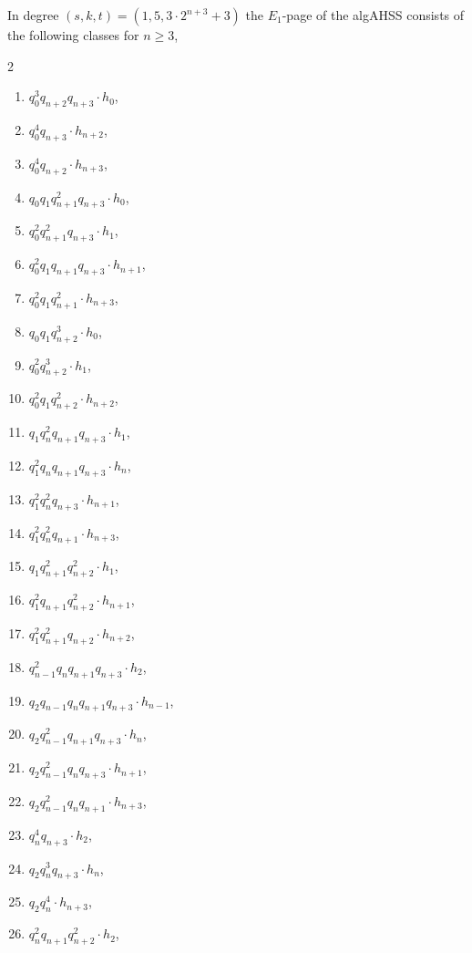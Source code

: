 \begin{lem} \label{candidates CESS}
  In degree $(s,k,t) = (1,5,3 \cdot 2^{n+3}+3)$ the $E_1$-page of the algAHSS consists of the following classes for $n \geq 3$,  
\begin{multicols}{2}
\begin{enumerate}
\item $q_0^3q_{n+2}q_{n+3} \cdot h_0$,
\item $q_0^4q_{n+3} \cdot h_{n+2}$,
\item $q_0^4q_{n+2} \cdot h_{n+3}$,
\item $q_0q_1q_{n+1}^2q_{n+3} \cdot h_0$,
\item $q_0^2q_{n+1}^2q_{n+3} \cdot h_1$,
\item $q_0^2q_1q_{n+1}q_{n+3} \cdot h_{n+1}$,
\item $q_0^2q_1q_{n+1}^2 \cdot h_{n+3}$,
\item $q_0q_1q_{n+2}^3 \cdot h_{0}$,
\item $q_0^2q_{n+2}^3 \cdot h_{1}$,
\item $q_0^2q_1q_{n+2}^2 \cdot h_{n+2}$,
\item $q_1q_n^2q_{n+1}q_{n+3} \cdot h_{1}$,
\item $q_1^2q_nq_{n+1}q_{n+3} \cdot h_{n}$,
\item $q_1^2q_n^2q_{n+3} \cdot h_{n+1}$,
\item $q_1^2q_n^2q_{n+1} \cdot h_{n+3}$,
\item $q_1q_{n+1}^2q_{n+2}^2 \cdot h_{1}$,
\item $q_1^2q_{n+1}q_{n+2}^2 \cdot h_{n+1}$,
\item $q_1^2q_{n+1}^2q_{n+2} \cdot h_{n+2}$,
\item $q_{n-1}^2q_nq_{n+1}q_{n+3} \cdot h_{2}$,
\item $q_{2}q_{n-1}q_nq_{n+1}q_{n+3} \cdot h_{n-1}$,
\item $q_{2}q_{n-1}^2q_{n+1}q_{n+3} \cdot h_{n}$,
\item $q_2q_{n-1}^2q_nq_{n+3} \cdot h_{n+1}$,
\item $q_2q_{n-1}^2q_nq_{n+1} \cdot h_{n+3}$,
\item $q_{n}^4q_{n+3} \cdot h_{2}$,
\item $q_2q_{n}^3q_{n+3} \cdot h_{n}$,
\item $q_2q_{n}^4 \cdot h_{n+3}$,
\item $q_{n}^2q_{n+1}q_{n+2}^2 \cdot h_{2}$,

\end{enumerate}
\end{multicols}
\end{lem}
